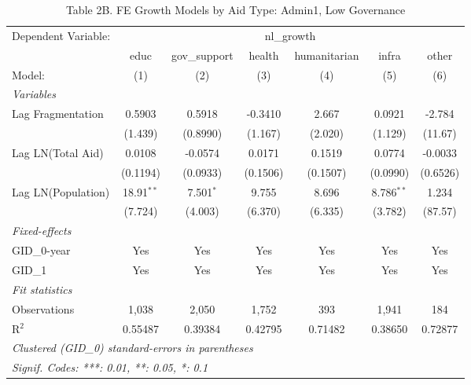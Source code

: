 \begin{table}[H]
   \caption{Table 2B. FE Growth Models by Aid Type: Admin1, Low Governance}
   \centering
   \begin{tabular}{lcccccc}
      \tabularnewline \midrule \midrule
      Dependent Variable: & \multicolumn{6}{c}{nl\_growth}\\
                         & educ         & gov\_support  & health   & humanitarian & infra        & other \\   
      Model:             & (1)          & (2)           & (3)      & (4)          & (5)          & (6)\\  
      \midrule
      \emph{Variables}\\
      Lag Fragmentation  & 0.5903       & 0.5918        & -0.3410  & 2.667        & 0.0921       & -2.784\\   
                         & (1.439)      & (0.8990)      & (1.167)  & (2.020)      & (1.129)      & (11.67)\\   
      Lag LN(Total Aid)  & 0.0108       & -0.0574       & 0.0171   & 0.1519       & 0.0774       & -0.0033\\   
                         & (0.1194)     & (0.0933)      & (0.1506) & (0.1507)     & (0.0990)     & (0.6526)\\   
      Lag LN(Population) & 18.91$^{**}$ & 7.501$^{*}$   & 9.755    & 8.696        & 8.786$^{**}$ & 1.234\\   
                         & (7.724)      & (4.003)       & (6.370)  & (6.335)      & (3.782)      & (87.57)\\   
      \midrule
      \emph{Fixed-effects}\\
      GID\_0-year        & Yes          & Yes           & Yes      & Yes          & Yes          & Yes\\  
      GID\_1             & Yes          & Yes           & Yes      & Yes          & Yes          & Yes\\  
      \midrule
      \emph{Fit statistics}\\
      Observations       & 1,038        & 2,050         & 1,752    & 393          & 1,941        & 184\\  
      R$^2$              & 0.55487      & 0.39384       & 0.42795  & 0.71482      & 0.38650      & 0.72877\\  
      \midrule \midrule
      \multicolumn{7}{l}{\emph{Clustered (GID\_0) standard-errors in parentheses}}\\
      \multicolumn{7}{l}{\emph{Signif. Codes: ***: 0.01, **: 0.05, *: 0.1}}\\
   \end{tabular}
\end{table}



